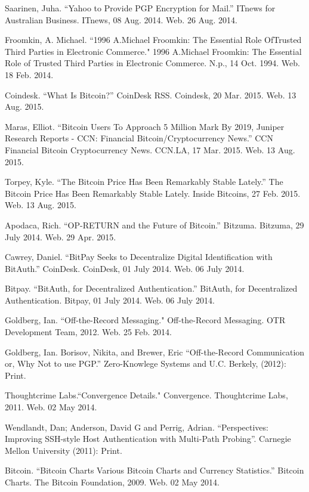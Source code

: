 \documentclass{llncs}
\begin{document}
\begin{thebibliography}{5}
Saarinen, Juha. ``Yahoo to Provide PGP Encryption for Mail.'' ITnews for Australian Business. ITnews, 08 Aug. 2014. Web. 26 Aug. 2014.

Froomkin, A. Michael. ``1996 A.Michael Froomkin: The Essential Role OfTrusted Third Parties in Electronic Commerce." 1996 A.Michael Froomkin: The Essential Role of Trusted Third Parties in Electronic Commerce. N.p., 14 Oct. 1994. Web. 18 Feb. 2014.

Coindesk. ``What Is Bitcoin?'' CoinDesk RSS. Coindesk, 20 Mar. 2015. Web. 13 Aug. 2015.

Maras, Elliot. ``Bitcoin Users To Approach 5 Million Mark By 2019, Juniper Research Reports - CCN: Financial Bitcoin/Cryptocurrency News.'' CCN Financial Bitcoin Cryptocurrency News. CCN.LA, 17 Mar. 2015. Web. 13 Aug. 2015.

Torpey, Kyle. ``The Bitcoin Price Has Been Remarkably Stable Lately.'' The Bitcoin Price Has Been Remarkably Stable Lately. Inside Bitcoins, 27 Feb. 2015. Web. 13 Aug. 2015.

Apodaca, Rich. ``OP-RETURN and the Future of Bitcoin.'' Bitzuma. Bitzuma, 29 July 2014. Web. 29 Apr. 2015.

Cawrey, Daniel. ``BitPay Seeks to Decentralize Digital Identification with BitAuth.'' CoinDesk. CoinDesk, 01 July 2014. Web. 06 July 2014.

Bitpay. ``BitAuth, for Decentralized Authentication.'' BitAuth, for Decentralized Authentication. Bitpay, 01 July 2014. Web. 06 July 2014.

Goldberg, Ian. ``Off-the-Record Messaging." Off-the-Record Messaging. OTR Development Team, 2012. Web. 25 Feb. 2014.

Goldberg, Ian. Borisov, Nikita, and Brewer, Eric ``Off-the-Record Communication or, Why Not to use PGP.'' Zero-Knowlege Systems and U.C. Berkely, (2012): Print. 

Thoughtcrime Labs.``Convergence Details." Convergence. Thoughtcrime Labs, 2011. Web. 02 May 2014.

Wendlandt, Dan; Anderson, David G and Perrig, Adrian. ``Perspectives: Improving SSH-style Host Authentication with Multi-Path Probing''.  Carnegie Mellon University (2011): Print.

Bitcoin. ``Bitcoin Charts Various Bitcoin Charts and Currency Statistics.'' Bitcoin Charts. The Bitcoin Foundation, 2009. Web. 02 May 2014.


\end{thebibliography}
\end{document}
